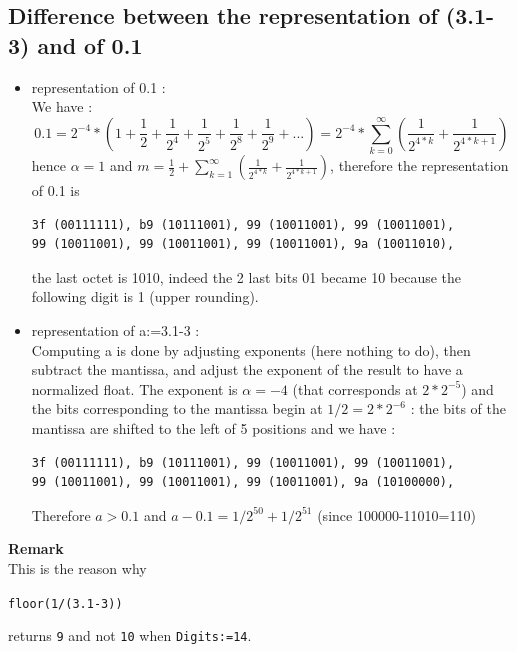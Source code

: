 \documentclass[a4paper,11pt]{book}
\begin{document}
\subsection{Difference between the representation of (3.1-3) and of 0.1}
\begin{itemize}
\item representation of  0.1 :\\
We have :
\[ 0.1=2^{-4}*(1+\frac{1}{2}+\frac{1}{2^4}+\frac{1}{2^5}+
\frac{1}{2^8}+\frac{1}{2^9}+...)=
2^{-4}*\sum_{k=0}^\infty (\frac{1}{2^{4*k}}+\frac{1}{2^{4*k+1}}) \]
hence $\alpha=1$ and $m=\frac{1}{2}+
\sum_{k=1}^\infty (\frac{1}{2^{4*k}}+\frac{1}{2^{4*k+1}})$,
therefore the representation of 0.1 is
\begin{verbatim}
3f (00111111), b9 (10111001), 99 (10011001), 99 (10011001),
99 (10011001), 99 (10011001), 99 (10011001), 9a (10011010),
\end{verbatim}
the last octet is 1010, indeed the 2 last bits 
01 became 10  because the following digit is 1 (upper rounding).

\item representation of a:=3.1-3 :\\
Computing a is done by adjusting exponents (here nothing
to do), then subtract the mantissa, and adjust the
exponent of the result to have a normalized float.
The exponent is $\alpha=-4$ (that corresponds at $2*2^{-5}$) 
and the bits 
corresponding to the mantissa begin at $1/2=2*2^{-6}$ :
the bits of the mantissa are shifted to the left of 5 positions
and we have :
\begin{verbatim}
3f (00111111), b9 (10111001), 99 (10011001), 99 (10011001),
99 (10011001), 99 (10011001), 99 (10011001), 9a (10100000),
\end{verbatim}
Therefore
$a>0.1$ and  $a-0.1=1/2^{50}+1/2^{51}$ 
(since 100000-11010=110)
\end{itemize}
{\bf Remark}\\
This is the reason why
\begin{center}
{\tt floor(1/(3.1-3))} 
\end{center}
returns {\tt 9} and not {\tt 10} when {\tt Digits:=14}.
\end{document}
